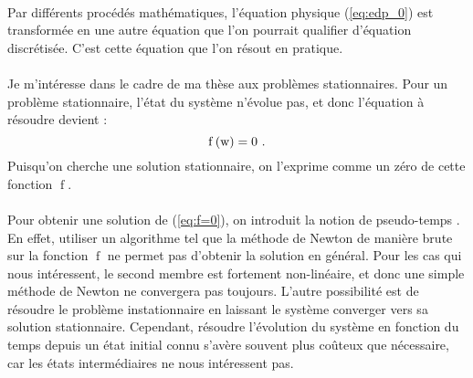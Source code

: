 		\paragraph{}
		Par différents procédés mathématiques, l'équation physique (\ref{eq:edp_0}) est transformée en une autre équation que l'on pourrait qualifier d'équation discrétisée.
		C'est cette équation que l'on résout en pratique.

		\paragraph{}
		Je m'intéresse dans le cadre de ma thèse aux problèmes stationnaires.
		Pour un problème stationnaire, l'état du système n'évolue pas, et donc l'équation à résoudre devient :
		\begin{equation}\label{eq:f=0}
			\operatorname{f}\left(\textup{w}\right) = 0\ .
		\end{equation}
		Puisqu'on cherche une solution stationnaire, on l'exprime comme un zéro de cette fonction $\operatorname{f}$.

		\paragraph{}
		Pour obtenir une solution de (\ref{eq:f=0}), on introduit la notion de pseudo-temps \cite{KelleyKeyes1996}.
		En effet, utiliser un algorithme tel que la méthode de Newton de manière brute sur la fonction $\operatorname{f}$ ne permet pas d'obtenir la solution en général.
		Pour les cas qui nous intéressent, le second membre est fortement non-linéaire, et donc une simple méthode de Newton ne convergera pas toujours.
		L'autre possibilité est de résoudre le problème instationnaire en laissant le système converger vers sa solution stationnaire.
		Cependant, résoudre l'évolution du système en fonction du temps depuis un état initial connu s'avère souvent plus coûteux que nécessaire, car les états intermédiaires ne nous intéressent pas.

